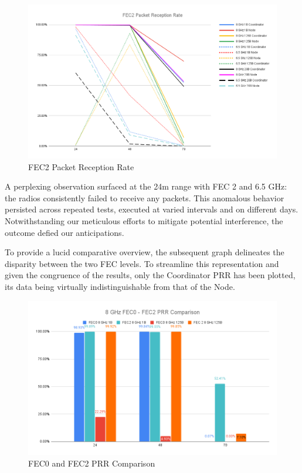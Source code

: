 \begin{figure}[h]
\centering
\includegraphics[width=\textwidth]{images/FEC2 Packet Reception Rate.png}
\caption{FEC2 Packet Reception Rate}
\label{fig:fec2_prr}
\end{figure}

A perplexing observation surfaced at the 24m range with FEC 2 and 6.5 GHz: the radios consistently failed to receive any packets. This anomalous behavior persisted across repeated tests, executed at varied intervals and on different days. Notwithstanding our meticulous efforts to mitigate potential interference, the outcome defied our anticipations.

To provide a lucid comparative overview, the subsequent graph delineates the disparity between the two FEC levels. To streamline this representation and given the congruence of the results, only the Coordinator PRR has been plotted, its data being virtually indistinguishable from that of the Node.


\begin{figure}[h]
\centering
\includegraphics[width=\textwidth]{images/8 GHz FEC0 - FEC2 PRR Comparison.png}
\caption{FEC0 and FEC2 PRR Comparison}
\label{fig:fec0_fec2_comparison}
\end{figure}

